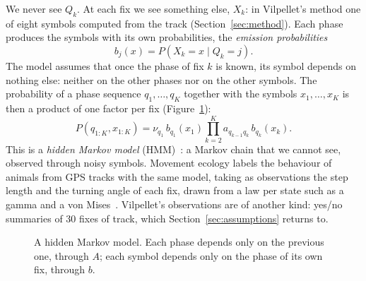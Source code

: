 We never see $Q_k$. At each fix we see something else, $X_k$: in Vilpellet's method one of eight
symbols computed from the track (Section~\ref{sec:method}). Each phase produces the symbols with
its own probabilities, the \emph{emission probabilities}
\begin{equation}\label{eq:emission}
  b_j(x) = P(X_k=x \mid Q_k=j).
\end{equation}
The model assumes that once the phase of fix $k$ is known, its symbol depends on nothing else:
neither on the other phases nor on the other symbols. The probability of a phase sequence
$q_1,\dots,q_K$ together with the symbols $x_1,\dots,x_K$ is then a product of one factor per
fix (Figure~\ref{fig:graphical}):
\begin{equation}\label{eq:joint}
  P(q_{1:K},x_{1:K}) = \nu_{q_1}\,b_{q_1}(x_1)\prod_{k=2}^{K} a_{q_{k-1}q_k}\,b_{q_k}(x_k).
\end{equation}
This is a \emph{hidden Markov model} (HMM)~\cite{rabiner1989,zucchini2016}: a Markov chain that we
cannot see, observed through noisy symbols. Movement ecology labels the behaviour of animals from
GPS tracks with the same model, taking as observations the step length and the turning angle of
each fix, drawn from a law per state such as a gamma and a von
Mises~\cite{langrock2012,michelot2016}. Vilpellet's observations are of another kind: yes/no
summaries of 30 fixes of track, which Section~\ref{sec:assumptions} returns to.

\begin{figure}
\centering
{}
\caption{A hidden Markov model. Each phase depends only on the previous one, through $A$; each
symbol depends only on the phase of its own fix, through $b$.}
\label{fig:graphical}
\end{figure}

